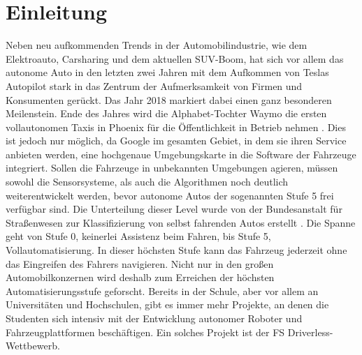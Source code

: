 \documentclass{like}
\begin{document}
  








\setcounter{page}{1}   %

\chapter{Einleitung}
Neben neu aufkommenden Trends in der Automobilindustrie, wie dem Elektroauto, Carsharing und dem aktuellen SUV-Boom, hat sich vor allem das autonome Auto in den letzten zwei Jahren mit dem Aufkommen von Teslas Autopilot stark in das Zentrum der Aufmerksamkeit von Firmen und Konsumenten gerückt. Das Jahr 2018 markiert dabei einen ganz besonderen Meilenstein. 
Ende des Jahres wird die Alphabet-Tochter Waymo die ersten vollautonomen Taxis in Phoenix für die Öffentlichkeit in Betrieb nehmen \cite{Waymo:1}. 
Dies ist jedoch nur möglich, da Google im gesamten Gebiet, in dem sie ihren Service anbieten werden, eine hochgenaue Umgebungskarte in die Software der Fahrzeuge integriert. Sollen die Fahrzeuge in unbekannten Umgebungen agieren, müssen sowohl die Sensorsysteme, als auch die Algorithmen noch deutlich weiterentwickelt werden, bevor autonome Autos der sogenannten Stufe 5 frei verfügbar sind. Die Unterteilung dieser Level wurde von der Bundesanstalt für Straßenwesen zur Klassifizierung von selbst fahrenden Autos erstellt \cite{BASt5L}. Die Spanne geht von Stufe 0, keinerlei Assistenz beim Fahren, bis Stufe 5, Vollautomatisierung. In dieser höchsten Stufe kann das Fahrzeug jederzeit ohne das Eingreifen des Fahrers navigieren. 
Nicht nur in den großen Automobilkonzernen wird deshalb zum Erreichen der höchsten Automatisierungsstufe geforscht. Bereits in der Schule, aber vor allem an Universitäten und Hochschulen, gibt es immer mehr Projekte, an denen die Studenten sich intensiv mit der Entwicklung autonomer Roboter und Fahrzeugplattformen beschäftigen. Ein solches Projekt ist der \ac{FS} Driverless-Wettbewerb.
\end{document}
